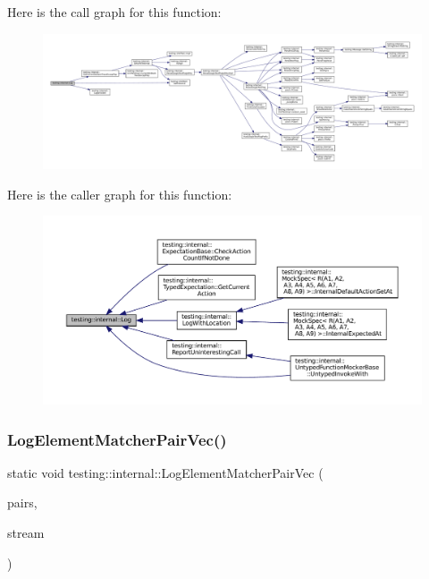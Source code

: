 Here is the call graph for this function\+:
\nopagebreak
\begin{figure}[H]
\begin{center}
\leavevmode
\includegraphics[width=350pt]{namespacetesting_1_1internal_ac0bc151763a8187d74387c4b2ba685c9_cgraph}
\end{center}
\end{figure}
Here is the caller graph for this function\+:
\nopagebreak
\begin{figure}[H]
\begin{center}
\leavevmode
\includegraphics[width=350pt]{namespacetesting_1_1internal_ac0bc151763a8187d74387c4b2ba685c9_icgraph}
\end{center}
\end{figure}
\mbox{\label{namespacetesting_1_1internal_a7e3ffe5f66db16c3ab89de55eac65bfa}} 
\subsubsection{\texorpdfstring{Log\+Element\+Matcher\+Pair\+Vec()}{LogElementMatcherPairVec()}}
{\footnotesize\ttfamily static void testing\+::internal\+::\+Log\+Element\+Matcher\+Pair\+Vec (\begin{DoxyParamCaption}\item[{const \hyperlink{namespacetesting_1_1internal_a0038618710c01a71150887dc7cfb0a29}{Element\+Matcher\+Pairs} \&}]{pairs,  }\item[{\+::std\+::ostream $\ast$}]{stream }\end{DoxyParamCaption})\hspace{0.3cm}{\ttfamily [static]}}



